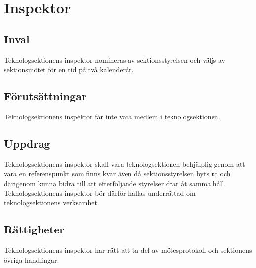 \section{Inspektor}

\subsection{Inval}
Teknologsektionens inspektor nomineras av sektionsstyrelsen och väljs av sektionsmötet för en tid på två kalenderår.

\subsection{Förutsättningar}
Teknologsektionens inspektor får inte vara medlem i teknologsektionen.

\subsection{Uppdrag}
Teknologsektionens inspektor skall vara teknologsektionen behjälplig genom att vara en referenspunkt som finns kvar även då sektionsstyrelsen byts ut och därigenom kunna bidra till att efterföljande styrelser drar åt samma håll. Teknologsektionens inspektor bör därför hållas underrättad om teknologsektionens verksamhet.

\subsection{Rättigheter}
Teknologsektionens inspektor har rätt att ta del av mötesprotokoll och sektionens övriga handlingar.